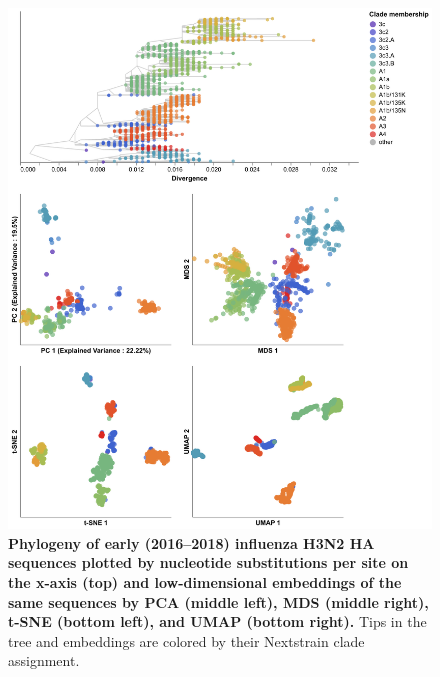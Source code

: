 \documentclass[10pt,letterpaper]{article}
\begin{document}

\begin{figure}[!h]
\includegraphics[width=\columnwidth]{figures/flu-2016-2018-ha-embeddings-by-clade.png}
\caption{{\bf Phylogeny of early (2016--2018) influenza H3N2 HA sequences plotted by nucleotide substitutions per site on the x-axis (top) and low-dimensional embeddings of the same sequences by PCA (middle left), MDS (middle right), t-SNE (bottom left), and UMAP (bottom right).}
  Tips in the tree and embeddings are colored by their Nextstrain clade assignment.
}
\label{fig:seasonal-influenza-h3n2-ha-embeddings}
\end{figure}
\end{document}
